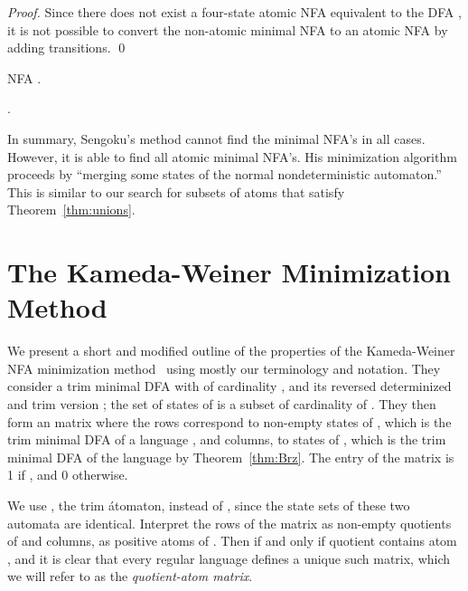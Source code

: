 \documentclass{llncs}
\begin{document}
\begin{proof}
Since there does not exist a four-state atomic NFA equivalent to the DFA ,
it is not possible to convert the non-atomic 
minimal NFA  to an atomic NFA by adding transitions.
\qed
\end{proof}

\begin{table}[t]
\vskip-0.5cm
\begin{minipage}[b]{0.3\linewidth}
\caption{NFA .}
\label{tab:n_mp}
\begin{center}

\end{center}
\end{minipage}
\hspace{0.5cm}
\begin{minipage}[b]{0.45\linewidth}
\caption{.}
\label{tab:n5_mp}
\begin{center}

\end{center}
\end{minipage}
\vskip-0.3cm
\end{table}

\vskip-0.1cm
In summary, Sengoku's method cannot find the minimal NFA's in all cases. 
However, it is able to find all atomic minimal NFA's.
His minimization algorithm proceeds by 
``merging some states of the normal nondeterministic automaton.''
This is similar to our search for subsets of atoms that satisfy 
Theorem~\ref{thm:unions}.

\section{The Kameda-Weiner Minimization Method}
\label{sec:KW}

We present a short and modified outline of the properties of the Kameda-Weiner 
NFA minimization method~\cite{KaWe70} using mostly our terminology and notation. 
They consider a trim minimal DFA  with  of 
cardinality , and its reversed  determinized and trim version ; 
the set of states of  is a subset  of cardinality  of 
. 
They then 
form an  matrix  where the rows correspond to non-empty states  of , 
which is the trim minimal DFA of a language , 
and columns, to states  of , 
which is the trim minimal DFA of the language  by Theorem~\ref{thm:Brz}.
The entry  of the matrix  is 1 if , and 0 otherwise.

We use , the trim \'atomaton,  instead of , 
since the state sets of these two automata are identical.  
Interpret the rows of the matrix as non-empty quotients of  and columns, 
as positive atoms of . Then  if and only if quotient  contains 
atom , and it is clear that every regular language defines a 
unique such matrix, which we will refer to as the \emph{quotient-atom matrix}.
\end{document}
